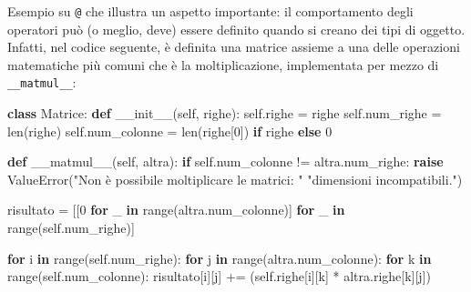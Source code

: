 \documentclass[
  letterpaper,
]{scrbook}
\newenvironment{Shaded}{\begin{snugshade}}{\end{snugshade}}
\newcommand{\BuiltInTok}[1]{\textcolor[rgb]{0.00,0.23,0.31}{#1}}
\newcommand{\ControlFlowTok}[1]{\textcolor[rgb]{0.00,0.23,0.31}{\textbf{#1}}}
\newcommand{\DecValTok}[1]{\textcolor[rgb]{0.68,0.00,0.00}{#1}}
\newcommand{\FunctionTok}[1]{\textcolor[rgb]{0.28,0.35,0.67}{#1}}
\newcommand{\KeywordTok}[1]{\textcolor[rgb]{0.00,0.23,0.31}{\textbf{#1}}}
\newcommand{\NormalTok}[1]{\textcolor[rgb]{0.00,0.23,0.31}{#1}}
\newcommand{\OperatorTok}[1]{\textcolor[rgb]{0.37,0.37,0.37}{#1}}
\newcommand{\PreprocessorTok}[1]{\textcolor[rgb]{0.68,0.00,0.00}{#1}}
\newcommand{\StringTok}[1]{\textcolor[rgb]{0.13,0.47,0.30}{#1}}
\newcommand{\VariableTok}[1]{\textcolor[rgb]{0.07,0.07,0.07}{#1}}
\newcommand*\circled[1]{\tikz[baseline=(char.base)]{
          \node[shape=circle,draw,inner sep=1pt] (char) {{\scriptsize#1}};}}
\begin{document}
Esempio su \texttt{@} che illustra un aspetto importante: il
comportamento degli operatori può (o meglio, deve) essere definito
quando si creano dei tipi di oggetto. Infatti, nel codice seguente, è
definita una matrice assieme a una delle operazioni matematiche più
comuni che è la moltiplicazione, implementata per mezzo di
\texttt{\_\_matmul\_\_}:

\label{annotated-cell-60}%
\begin{Shaded}
\begin{Highlighting}[]
\KeywordTok{class}\NormalTok{ Matrice:}
  \KeywordTok{def} \FunctionTok{\_\_init\_\_}\NormalTok{(}\VariableTok{self}\NormalTok{, righe):}
    \VariableTok{self}\NormalTok{.righe }\OperatorTok{=}\NormalTok{ righe}
    \VariableTok{self}\NormalTok{.num\_righe }\OperatorTok{=} \BuiltInTok{len}\NormalTok{(righe)}
    \VariableTok{self}\NormalTok{.num\_colonne }\OperatorTok{=} \BuiltInTok{len}\NormalTok{(righe[}\DecValTok{0}\NormalTok{]) }\ControlFlowTok{if}\NormalTok{ righe }\ControlFlowTok{else} \DecValTok{0}

  \KeywordTok{def} \FunctionTok{\_\_matmul\_\_}\NormalTok{(}\VariableTok{self}\NormalTok{, altra):}
    \ControlFlowTok{if} \VariableTok{self}\NormalTok{.num\_colonne }\OperatorTok{!=}\NormalTok{ altra.num\_righe: }\hspace*{\fill}\NormalTok{\circled{1}}
      \ControlFlowTok{raise} \PreprocessorTok{ValueError}\NormalTok{(}\StringTok{"Non è possibile moltiplicare le matrici: "}
                       \StringTok{"dimensioni incompatibili."}\NormalTok{)}
    
\NormalTok{    risultato }\OperatorTok{=}\NormalTok{ [[}\DecValTok{0} \ControlFlowTok{for}\NormalTok{ \_ }\KeywordTok{in} \BuiltInTok{range}\NormalTok{(altra.num\_colonne)] }\hspace*{\fill}\NormalTok{\circled{2}}
           \ControlFlowTok{for}\NormalTok{ \_ }\KeywordTok{in} \BuiltInTok{range}\NormalTok{(}\VariableTok{self}\NormalTok{.num\_righe)]}
    
    \ControlFlowTok{for}\NormalTok{ i }\KeywordTok{in} \BuiltInTok{range}\NormalTok{(}\VariableTok{self}\NormalTok{.num\_righe): }\hspace*{\fill}\NormalTok{\circled{3}}
      \ControlFlowTok{for}\NormalTok{ j }\KeywordTok{in} \BuiltInTok{range}\NormalTok{(altra.num\_colonne):}
        \ControlFlowTok{for}\NormalTok{ k }\KeywordTok{in} \BuiltInTok{range}\NormalTok{(}\VariableTok{self}\NormalTok{.num\_colonne):}
\NormalTok{          risultato[i][j] }\OperatorTok{+=}\NormalTok{ (}\VariableTok{self}\NormalTok{.righe[i][k] }\OperatorTok{*}
\NormalTok{                    altra.righe[k][j])}
    

\end{Highlighting}
\end{Shaded}
\end{document}
